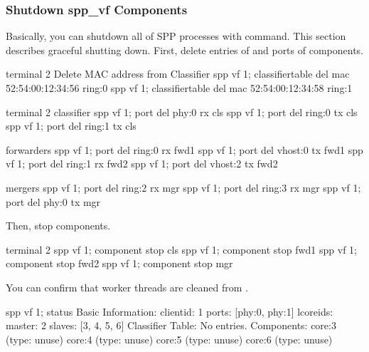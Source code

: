 \documentclass[a4paper,11pt,openany,oneside,english]{sphinxmanual}
\begin{document}
\subsubsection{Shutdown spp\_vf Components}
\label{\detokenize{usecases/spp_vf:shutdown-spp-vf-components}}\label{\detokenize{usecases/spp_vf:spp-vf-use-cases-shutdown-comps}}
Basically, you can shutdown all of SPP processes with 
command.
This section describes graceful shutting down.
First, delete entries of  and ports of components.

\begin{sphinxVerbatim}[commandchars=\\\{\},formatcom=\footnotesize]
\PYGZsh{} terminal 2
\PYGZsh{} Delete MAC address from Classifier
spp \PYGZgt{} vf 1; classifier\PYGZus{}table del mac 52:54:00:12:34:56 ring:0
spp \PYGZgt{} vf 1; classifier\PYGZus{}table del mac 52:54:00:12:34:58 ring:1
\end{sphinxVerbatim}

\begin{sphinxVerbatim}[commandchars=\\\{\},formatcom=\footnotesize]
\PYGZsh{} terminal 2
\PYGZsh{} classifier
spp \PYGZgt{} vf 1; port del phy:0 rx cls
spp \PYGZgt{} vf 1; port del ring:0 tx cls
spp \PYGZgt{} vf 1; port del ring:1 tx cls

\PYGZsh{} forwarders
spp \PYGZgt{} vf 1; port del ring:0 rx fwd1
spp \PYGZgt{} vf 1; port del vhost:0 tx fwd1
spp \PYGZgt{} vf 1; port del ring:1 rx fwd2
spp \PYGZgt{} vf 1; port del vhost:2 tx fwd2

\PYGZsh{} mergers
spp \PYGZgt{} vf 1; port del ring:2 rx mgr
spp \PYGZgt{} vf 1; port del ring:3 rx mgr
spp \PYGZgt{} vf 1; port del phy:0 tx mgr
\end{sphinxVerbatim}

Then, stop components.

\begin{sphinxVerbatim}[commandchars=\\\{\},formatcom=\footnotesize]
\PYGZsh{} terminal 2
spp \PYGZgt{} vf 1; component stop cls
spp \PYGZgt{} vf 1; component stop fwd1
spp \PYGZgt{} vf 1; component stop fwd2
spp \PYGZgt{} vf 1; component stop mgr
\end{sphinxVerbatim}

You can confirm that worker threads are cleaned from .

\begin{sphinxVerbatim}[commandchars=\\\{\},formatcom=\footnotesize]
spp \PYGZgt{} vf 1; status
Basic Information:
  \PYGZhy{} client\PYGZhy{}id: 1
  \PYGZhy{} ports: [phy:0, phy:1]
  \PYGZhy{} lcore\PYGZus{}ids:
    \PYGZhy{} master: 2
    \PYGZhy{} slaves: [3, 4, 5, 6]
Classifier Table:
  No entries.
Components:
  \PYGZhy{} core:3 \PYGZsq{}\PYGZsq{} (type: unuse)
  \PYGZhy{} core:4 \PYGZsq{}\PYGZsq{} (type: unuse)
  \PYGZhy{} core:5 \PYGZsq{}\PYGZsq{} (type: unuse)
  \PYGZhy{} core:6 \PYGZsq{}\PYGZsq{} (type: unuse)
\end{sphinxVerbatim}
\end{document}
